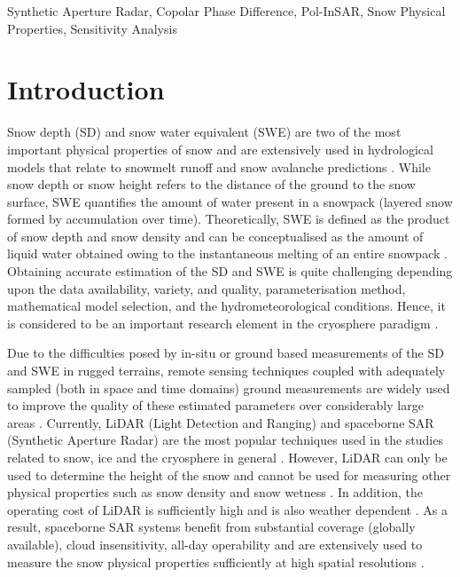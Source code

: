 \documentclass[review]{elsarticle}
\numberwithin{equation}{section}
\numberwithin{figure}{section}
\numberwithin{table}{section}
\begin{document}
\begin{frontmatter}
\begin{abstract}
\end{abstract}

\begin{keyword}
Synthetic Aperture Radar, Copolar Phase Difference, Pol-InSAR, Snow Physical Properties, Sensitivity Analysis
\end{keyword}

\end{frontmatter}

\linenumbers

\section{Introduction}
\label{sec:Intro}

Snow depth (SD) and snow water equivalent (SWE) are two of the most important physical properties of snow and are extensively used in hydrological models that relate to snowmelt runoff and snow avalanche predictions \citep{Thakur2017}. While snow depth or snow height refers to the distance of the ground to the snow surface, SWE quantifies the amount of water present in a snowpack (layered snow formed by accumulation over time). Theoretically, SWE is defined as the product of snow depth and snow density and can be conceptualised as the amount of liquid water obtained owing to the instantaneous melting of
an entire snowpack \citep{Tedesco2015}. Obtaining accurate estimation of the SD and SWE is quite challenging depending upon the data availability, variety, and quality, parameterisation method, mathematical model selection, and the hydrometeorological conditions. Hence, it is considered to be an important research element in the cryosphere paradigm \citep{Leinss2014, Leinss2015, Leinss2016, Conde2018}.

Due to the difficulties posed by in-situ or ground based measurements of the SD and SWE in rugged terrains, remote sensing techniques coupled with adequately sampled (both in space and time domains) ground measurements are widely used to improve the quality of these estimated parameters over considerably large areas \citep{Takala2011}. Currently, LiDAR (Light Detection and Ranging) and spaceborne SAR (Synthetic Aperture Radar) are the most popular techniques used in the studies related to snow, ice and the cryosphere in general \citep{Deems2013, Leinss2014, Tedesco2015}. However, LiDAR can only be used to determine the height of the snow and cannot be used for measuring other physical properties such as snow density and snow wetness \citep{Tedesco2015, Leinss2014}. In addition, the operating cost of LiDAR is sufficiently high and is also weather dependent \citep{Deems2013}. As a result, spaceborne SAR systems benefit from substantial coverage (globally available), cloud insensitivity, all-day operability and are extensively used to measure the snow physical properties sufficiently at high spatial resolutions \citep{Moreira2013, Thakur2012}.
\end{document}
